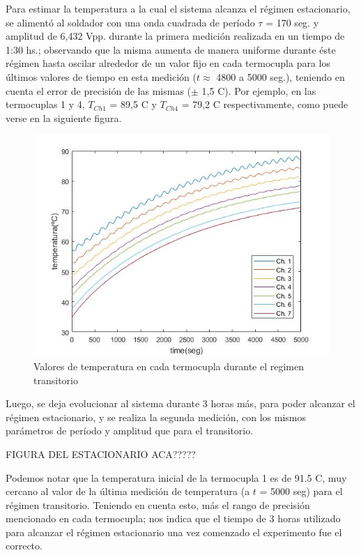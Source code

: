 \documentclass[twoside,twocolumn,a4paper]{article}
\begin{document}
Para estimar la temperatura a la cual el sistema alcanza el r\'egimen estacionario, se aliment\'o al soldador con una onda cuadrada de per\'iodo $\tau$ = 170 seg. y amplitud de 6,432 Vpp. durante la primera medici\'on realizada en un tiempo de 1:30 hs.; observando que la misma aumenta de manera uniforme durante \'este r\'egimen hasta oscilar alrededor de un valor fijo en cada termocupla para los \'ultimos valores de tiempo en esta medici\'on ($t \approx$ 4800 a 5000 seg.), teniendo en cuenta el error de precisi\'on de las mismas ($\pm$ 1,5 \degree C). Por ejemplo, en las termocuplas 1 y 4, $T_{Ch 1}$ = 89,5 \degree C y $T_{Ch 4}$ = 79,2 \degree C respectivamente, como puede verse en la siguiente figura.

\begin{figure}[H]
\includegraphics[width=\linewidth]{Tvst_transitorio.jpg}
\caption{Valores de temperatura en cada termocupla durante el regimen transitorio}
\label{fig:Tvst_transitorio}
\end{figure}


Luego, se deja evolucionar al sistema durante 3 horas m\'as, para poder alcanzar el r\'egimen estacionario, y se realiza la segunda medici\'on, con los mismos par\'ametros de per\'iodo y amplitud que para el transitorio.

FIGURA DEL ESTACIONARIO ACA?????

Podemos notar que la temperatura inicial de la termocupla 1 es de 91.5 \degree C, muy cercano al valor de la \'ultima medici\'on de temperatura (a $t$ = 5000 seg) para el r\'egimen transitorio. Teniendo en cuenta esto, m\'as el rango de precisi\'on mencionado en cada termocupla; nos indica que el tiempo de 3 horas utilizado para alcanzar el r\'egimen estacionario una vez comenzado el experimento fue el correcto.
\end{document}
